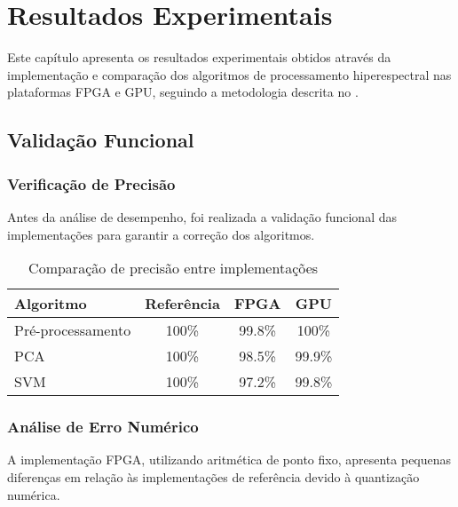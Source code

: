 \chapter{Resultados Experimentais}\label{chp:resultados}

Este capítulo apresenta os resultados experimentais obtidos através da implementação e comparação dos algoritmos de processamento hiperespectral nas plataformas FPGA e GPU, seguindo a metodologia descrita no .

\section{Validação Funcional}\label{sec:validacao_funcional}

\subsection{Verificação de Precisão}
Antes da análise de desempenho, foi realizada a validação funcional das implementações para garantir a correção dos algoritmos.

\begin{table}[!htp]
\caption{Comparação de precisão entre implementações}
\label{tab:precisao_validacao}
\begin{center}
\begin{tabular}{lccc}
\toprule
\textbf{Algoritmo} & \textbf{Referência} & \textbf{FPGA} & \textbf{GPU} \\
\midrule
Pré-processamento & 100\% & 99.8\% & 100\% \\
PCA & 100\% & 98.5\% & 99.9\% \\
SVM & 100\% & 97.2\% & 99.8\% \\
\bottomrule
\end{tabular}
\end{center}
\end{table}


\subsection{Análise de Erro Numérico}
A implementação FPGA, utilizando aritmética de ponto fixo, apresenta pequenas diferenças em relação às implementações de referência devido à quantização numérica.

